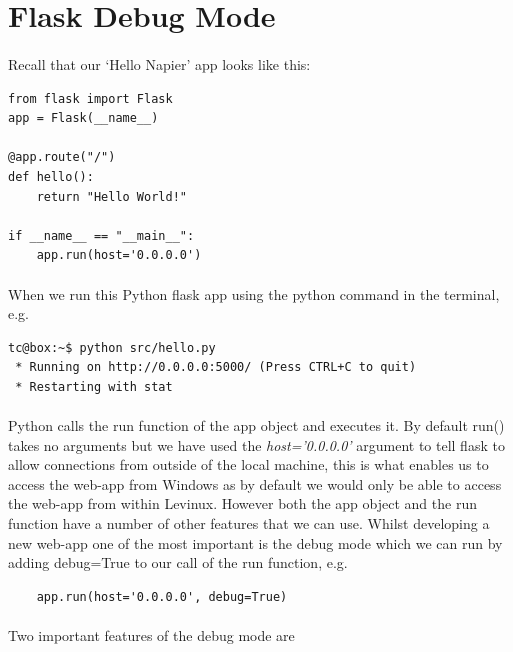 \documentclass[12pt, a4paper, twoside]{book}
\begin{document}
\section{Flask Debug Mode}
\label{debug}
\paragraph{} Recall that our `Hello Napier' app looks like this:

\begin{lstlisting}
from flask import Flask
app = Flask(__name__)

@app.route("/")
def hello():
    return "Hello World!"

if __name__ == "__main__":
    app.run(host='0.0.0.0')
\end{lstlisting}

\paragraph{} When we run this Python flask app using the python command in the terminal, e.g.

\begin{lstlisting}[style=DOS]
tc@box:~$ python src/hello.py 
 * Running on http://0.0.0.0:5000/ (Press CTRL+C to quit)
 * Restarting with stat
\end{lstlisting}

\paragraph{} Python calls the run function of the app object and executes it. By default run() takes no arguments but we have used the \emph{host='0.0.0.0'} argument to tell flask to allow connections from outside of the local machine, this is what enables us to access the web-app from Windows as by default we would only be able to access the web-app from within Levinux. However both the app object and the run function have a number of other features that we can use. Whilst developing a new web-app one of the most important is the debug mode which we can run by adding debug=True to our call of the run function, e.g.

\begin{lstlisting}
    app.run(host='0.0.0.0', debug=True)
\end{lstlisting}

\paragraph{} Two important features of the debug mode are
\end{document}
